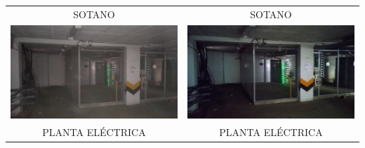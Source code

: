 \documentclass[12pt,a4paper,twoside]{article}
\begin{document}
{\begin{tabular}{ c c }
	SOTANO & SOTANO \\
	\includegraphics[width = 7 cm]{Imagenes/44} & \includegraphics[width = 7 cm]{Imagenes/42} \\
	PLANTA ELÉCTRICA & PLANTA ELÉCTRICA\\
	
%	
\end{tabular}
%

}
\end{document}
